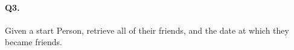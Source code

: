 \paragraph{Q3.}

Given a start Person, retrieve all of their friends, and the date at
which they became friends.
